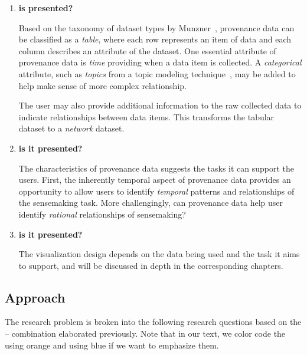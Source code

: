 \begin{enumerate}
	\item \textbf{ is presented?}
	
	Based on the taxonomy of dataset types by Munzner~\cite{Munzner2014}, provenance data can be classified as a \emph{table}, where each row represents an item of data and each column describes an attribute of the dataset. One essential attribute of provenance data is \emph{time} providing when a data item is collected. A \emph{categorical} attribute, such as \emph{topics} from a topic modeling technique~\cite{Blei2003}, may be added to help make sense of more complex relationship.
	
	The user may also provide additional information to the raw collected data to indicate relationships between data items. This transforms the tabular dataset to a \emph{network} dataset.
	
	\item \textbf{ is it presented?}
	
	The characteristics of provenance data suggests the tasks it can support the users. First, the inherently temporal aspect of provenance data provides an opportunity to allow users to identify \emph{temporal} patterns and relationships of the sensemaking task. More challengingly, can provenance data help user identify \emph{rational} relationships of sensemaking?
	
	\item \textbf{ is it presented?}
	
	The visualization design depends on the data being used and the task it aims to support, and will be discussed in depth in the corresponding chapters.
\end{enumerate}

\subsection{Approach}

The research problem is broken into the following research questions based on the \emph{}--\emph{} combination elaborated previously. Note that in our text, we color code the  using orange and  using blue if we want to emphasize them.

